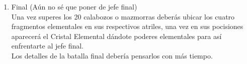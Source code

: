 \documentclass{article}
\begin{document}
\begin{enumerate}
    \item Final (Aún no sé que poner de jefe final)\\
    Una vez superes los 20 calabozos o mazmorras deberás ubicar los cuatro fragmentos elementales en sus respectivos atriles, una vez en sus pocisiones aparecerá el Cristal Elemental dándote poderes elementales para así enfrentarte al jefe final.\\
    
    Los detalles de la batalla final debería pensarlos con más tiempo.
\end{enumerate}
\end{document}

